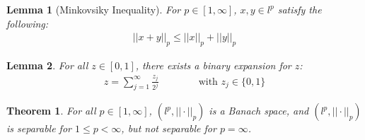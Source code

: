 \documentclass[11pt]{book}
\theoremstyle{break}
\theoremstyle{break}
\newtheorem{thm}{Theorem}[section]
\newtheorem{lem}{Lemma}[thm]
\begin{document}
\begin{lem}[Minkovsiky Inequality]
For $p \in [1,\infty]$, $x,y \in l^p$ satisfy the following:
\begin{align}
||x+y||_p \leq ||x||_p + ||y||_p
\end{align}
\end{lem}

\begin{lem}
For all $z \in [0,1]$, there exists a binary expansion for $z$:
\begin{align}
z = \sum_{j=1}^\infty \frac{z_j}{2^j} \qquad\qquad\text{with }z_j \in \{0,1\}
\end{align}
\end{lem}


\begin{thm}
For all $p \in [1,\infty]$, $(l^p, ||\cdot ||_p)$ is a Banach space, and $(l^p, ||\cdot ||_p)$ is separable for $1 \leq p < \infty$, but not separable for $p = \infty$. 
\end{thm}
\end{document}
